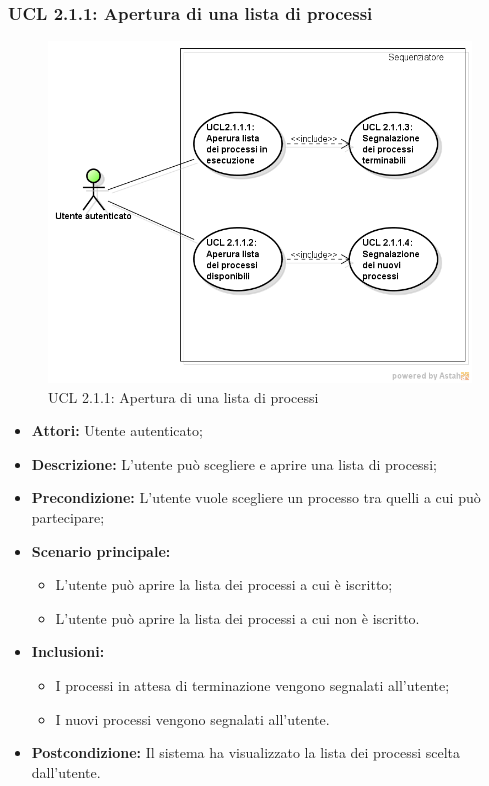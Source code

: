 \subsubsection{UCL 2.1.1: Apertura di una lista di processi}
\begin{figure}[H]
\centering
\includegraphics[trim=0cm 0.8cm 0cm 0cm,clip=true,width=%
\textwidth]
{./grafici/L211}
\caption{UCL 2.1.1: Apertura di una lista di processi}
\end{figure}
\begin{itemize}
\item \textbf{Attori:} Utente autenticato;
\item \textbf{Descrizione:} L'utente può scegliere e aprire una lista di processi;
\item \textbf{Precondizione:} L'utente vuole scegliere un processo tra quelli a cui può partecipare;
\item \textbf{Scenario principale:}
\begin{itemize}
\item L'utente può aprire la lista dei processi a cui è iscritto;
\item L'utente può aprire la lista dei processi a cui non è iscritto.
\end{itemize}
\item \textbf{Inclusioni:}
\begin{itemize}
\item I processi in attesa di terminazione vengono segnalati all'utente;
\item I nuovi processi vengono segnalati all'utente.
\end{itemize}
\item \textbf{Postcondizione:} Il sistema ha visualizzato la lista dei processi scelta dall'utente.
\end{itemize}

